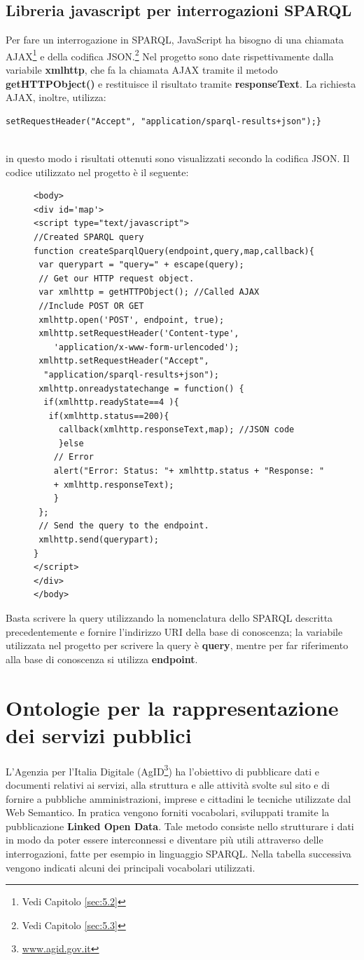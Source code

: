 \documentclass[a4paper,11pt]{article}
\begin{document}
\subsection{Libreria javascript per interrogazioni SPARQL}
\label{sec:4.2}
Per fare un interrogazione in SPARQL, JavaScript ha bisogno di una chiamata AJAX\footnote{Vedi Capitolo \ref{sec:5.2}} e della codifica JSON.\footnote{Vedi Capitolo \ref{sec:5.3}}
Nel progetto sono date rispettivamente dalla variabile \textbf{xmlhttp}, che fa la chiamata AJAX tramite il metodo \textbf{getHTTPObject()} e restituisce il risultato tramite \textbf{responseText}.
La richiesta AJAX, inoltre, utilizza: 
\begin{lstlisting}[style=htmlcssjs]
setRequestHeader("Accept", "application/sparql-results+json");} 
 
\end{lstlisting} 
in questo modo i risultati ottenuti sono visualizzati secondo la codifica JSON.
Il codice utilizzato nel progetto è il seguente:
\begin{figure}[!htb]
\begin{lstlisting}[style=htmlcssjs]
<body>		
<div id='map'>
<script type="text/javascript">
//Created SPARQL query
function createSparqlQuery(endpoint,query,map,callback){	
 var querypart = "query=" + escape(query);
 // Get our HTTP request object.
 var xmlhttp = getHTTPObject(); //Called AJAX
 //Include POST OR GET
 xmlhttp.open('POST', endpoint, true); 
 xmlhttp.setRequestHeader('Content-type',
 	'application/x-www-form-urlencoded');
 xmlhttp.setRequestHeader("Accept", 
  "application/sparql-results+json");	
 xmlhttp.onreadystatechange = function() {
  if(xmlhttp.readyState==4 ){
   if(xmlhttp.status==200){				
	 callback(xmlhttp.responseText,map); //JSON code
	 }else
	// Error
	alert("Error: Status: "+ xmlhttp.status + "Response: "
	+ xmlhttp.responseText);
	}	
 };
 // Send the query to the endpoint.
 xmlhttp.send(querypart);	
}
</script>
</div>
</body>
\end{lstlisting}
\end{figure}\newline
Basta scrivere la query utilizzando la nomenclatura dello SPARQL descritta precedentemente e fornire l'indirizzo URI della base di conoscenza; la variabile utilizzata nel progetto per scrivere la query è \textbf{query}, mentre per far riferimento alla base di conoscenza si utilizza \textbf{endpoint}.
\newpage
\section{Ontologie per la rappresentazione dei servizi pubblici}
\label{sec:5}
L’Agenzia per l’Italia Digitale (AgID\footnote{\url{www.agid.gov.it}}) ha l'obiettivo di pubblicare dati e documenti relativi ai servizi, alla struttura e alle attività svolte sul sito e di fornire a pubbliche amministrazioni, imprese e cittadini le tecniche utilizzate dal Web Semantico. In pratica vengono forniti vocabolari, sviluppati tramite la pubblicazione \textbf{Linked Open Data}. Tale metodo consiste nello strutturare i dati in modo da poter essere interconnessi e diventare più utili attraverso delle interrogazioni, fatte per esempio in linguaggio SPARQL. 
Nella tabella successiva vengono indicati alcuni dei principali vocabolari utilizzati.
\end{document}
